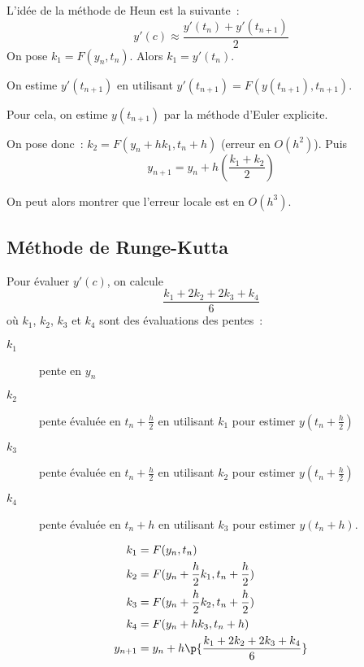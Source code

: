 \clearslide{}
L'idée de la méthode de Heun est la suivante~:
\begin{equation*}
  y'(c)\approx \frac{y'(t_{n})+y'(t_{n+1})}{2}
\end{equation*}
On pose $\boxed{k_{1} = F(y_{n},t_{n})}$.
Alors $k_{1} = y'(t_{n})$.

On estime $y'(t_{n+1})$ en utilisant $y'(t_{n+1}) = F(y(t_{n+1}),
t_{n+1})$.

Pour cela, on estime $y(t_{n+1})$ par la méthode d'Euler
explicite.

On pose donc~: $\boxed{k_{2} = F(y_{n}+hk_{1},t_{n}+h)}$ (erreur en $O(h^{2})$).
Puis
\begin{equation*}
  \boxed{y_{n+1} = y_{n} + h
\left(
  \frac{k_{1}+k_{2}}{2}
\right)}
\end{equation*}


On peut alors montrer que l'erreur locale est en $O(h^{3})$.

\clearslide{}

\subsection{Méthode de Runge-Kutta}

Pour évaluer $y'(c)$, on calcule
\begin{equation*}
  \frac{k_{1} + 2 k_{2} + 2 k_{3} + k_{4}}{6}
\end{equation*}
où $k_{1}$, $k_{2}$, $k_{3}$ et $k_{4}$ sont des évaluations des
pentes~:
\begin{description}
\item[$k_{1}$] pente en $y_{n}$
\item[$k_2$] pente évaluée en $t_{n}+\frac{h}{2}$ en utilisant $k_{1}$
  pour estimer $y(t_{n}+\frac{h}{2})$
\item[$k_3$] pente évaluée en $t_{n}+\frac{h}{2}$ en utilisant $k_{2}$
  pour estimer $y(t_{n}+\frac{h}{2})$
\item[$k_4$] pente évaluée en $t_{n}+h$ en utilisant $k_{3}$ pour
  estimer $y(t_{n}+h)$.
\end{description}
\begin{align*}
  k_{1} &= F(y_{n}, t_{n})\\
  k_{2} &= F(y_{n} + \frac{h}{2}k_{1},t_{n} + \frac{h}{2})\\
  k_{3} &= F(y_{n} + \frac{h}{2}k_{2},t_{n}+ \frac{h}{2})\\
  k_{4} &= F(y_{n}+h k_{3},t_{n}+h)\\
  y_{n+1} &= y_{n} +h \p{\frac{k_{1}+2k_{2}+2k_{3}+k_{4}}{6}}
\end{align*}

